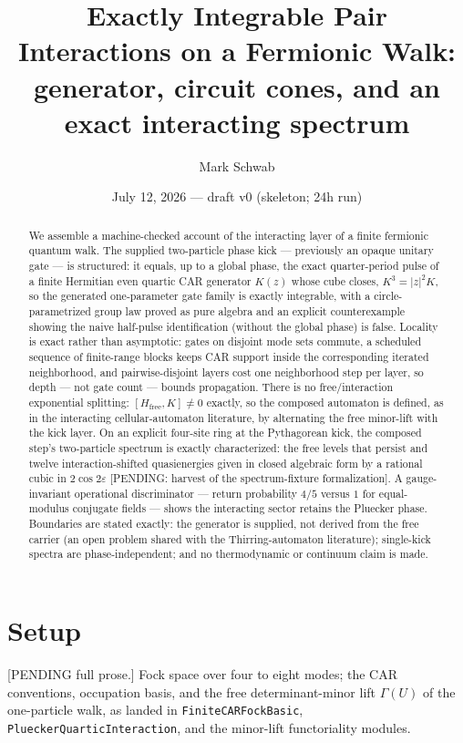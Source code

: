 \documentclass[11pt]{article}
\title{Exactly Integrable Pair Interactions on a Fermionic Walk:\\
generator, circuit cones, and an exact interacting spectrum}
\author{Mark Schwab}
\date{July 12, 2026 --- draft v0 (skeleton; 24h run)}
\begin{document}
\maketitle

\begin{abstract}
We assemble a machine-checked account of the interacting layer of a
finite fermionic quantum walk.  The supplied two-particle phase kick ---
previously an opaque unitary gate --- is structured: it equals, up to a
global phase, the exact quarter-period pulse of a finite Hermitian even
quartic CAR generator $K(z)$ whose cube closes, $K^3=|z|^2K$, so the
generated one-parameter gate family is exactly integrable, with a
circle-parametrized group law proved as pure algebra and an explicit
counterexample showing the naive half-pulse identification (without the
global phase) is false.  Locality is exact rather than asymptotic:
gates on disjoint mode sets commute, a scheduled sequence of finite-range
blocks keeps CAR support inside the corresponding iterated neighborhood,
and pairwise-disjoint layers cost one neighborhood step per layer, so
depth --- not gate count --- bounds propagation.  There is no
free/interaction exponential splitting: $[H_{\mathrm{free}},K]\neq0$
exactly, so the composed automaton is defined, as in the interacting
cellular-automaton literature, by alternating the free minor-lift with
the kick layer.  On an explicit four-site ring at the Pythagorean kick,
the composed step's two-particle spectrum is exactly characterized:
the free levels that persist and twelve interaction-shifted quasienergies
given in closed algebraic form by a rational cubic in $2\cos2\varepsilon$
[PENDING: harvest of the spectrum-fixture formalization].  A
gauge-invariant operational discriminator --- return probability $4/5$
versus $1$ for equal-modulus conjugate fields --- shows the interacting
sector retains the Pluecker phase.  Boundaries are stated exactly: the
generator is supplied, not derived from the free carrier (an open
problem shared with the Thirring-automaton literature); single-kick
spectra are phase-independent; and no thermodynamic or continuum claim
is made.
\end{abstract}

\section{Setup}
[PENDING full prose.]  Fock space over four to eight modes; the CAR
conventions, occupation basis, and the free determinant-minor lift
$\Gamma(U)$ of the one-particle walk, as landed in
\texttt{FiniteCARFockBasic}, \texttt{PlueckerQuarticInteraction}, and the
minor-lift functoriality modules.
\end{document}
